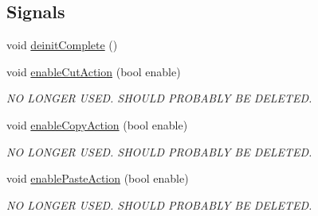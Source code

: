 \subsection*{Signals}
\begin{DoxyCompactItemize}
\item 
void \hyperlink{class_viewer_aa8f10afad8094330d363080b275daaeb}{deinit\-Complete} ()
\item 
\hypertarget{class_viewer_af867becef29c20dc442b85c61c4d8403}{void \hyperlink{class_viewer_af867becef29c20dc442b85c61c4d8403}{enable\-Cut\-Action} (bool enable)}\label{class_viewer_af867becef29c20dc442b85c61c4d8403}

\begin{DoxyCompactList}\small\item\em N\-O L\-O\-N\-G\-E\-R U\-S\-E\-D. S\-H\-O\-U\-L\-D P\-R\-O\-B\-A\-B\-L\-Y B\-E D\-E\-L\-E\-T\-E\-D. \end{DoxyCompactList}\item 
\hypertarget{class_viewer_a0af3752fbdfcab15fc5d157459f5d2eb}{void \hyperlink{class_viewer_a0af3752fbdfcab15fc5d157459f5d2eb}{enable\-Copy\-Action} (bool enable)}\label{class_viewer_a0af3752fbdfcab15fc5d157459f5d2eb}

\begin{DoxyCompactList}\small\item\em N\-O L\-O\-N\-G\-E\-R U\-S\-E\-D. S\-H\-O\-U\-L\-D P\-R\-O\-B\-A\-B\-L\-Y B\-E D\-E\-L\-E\-T\-E\-D. \end{DoxyCompactList}\item 
\hypertarget{class_viewer_a305f3dfbf71cd6b987f6e85c4461e388}{void \hyperlink{class_viewer_a305f3dfbf71cd6b987f6e85c4461e388}{enable\-Paste\-Action} (bool enable)}\label{class_viewer_a305f3dfbf71cd6b987f6e85c4461e388}

\begin{DoxyCompactList}\small\item\em N\-O L\-O\-N\-G\-E\-R U\-S\-E\-D. S\-H\-O\-U\-L\-D P\-R\-O\-B\-A\-B\-L\-Y B\-E D\-E\-L\-E\-T\-E\-D. \end{DoxyCompactList}\end{DoxyCompactItemize}
